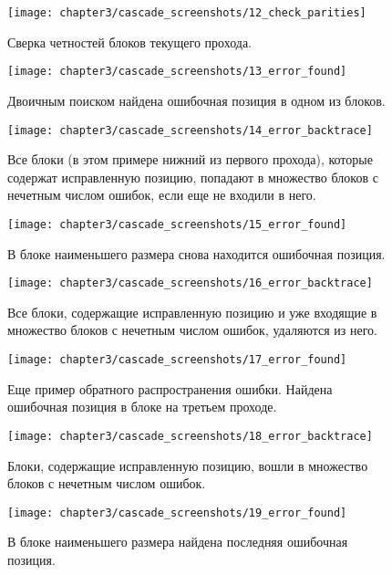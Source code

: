 \begin{figure}[h]
  \texttt{[image: chapter3/cascade\_screenshots/12\_check\_parities]}
  \caption{Сверка четностей блоков текущего прохода.}
\end{figure}

\begin{figure}[h]
  \texttt{[image: chapter3/cascade\_screenshots/13\_error\_found]}
  \caption{Двоичным поиском найдена ошибочная позиция в одном из блоков.}
\end{figure}

\begin{figure}[h]
  \texttt{[image: chapter3/cascade\_screenshots/14\_error\_backtrace]}
  \caption{Все блоки (в этом примере нижний из первого прохода), которые содержат исправленную позицию, попадают в множество блоков с нечетным числом ошибок, если еще не входили в него.}
\end{figure}

\begin{figure}[h]
  \texttt{[image: chapter3/cascade\_screenshots/15\_error\_found]}
  \caption{В блоке наименьшего размера снова находится ошибочная позиция.}
\end{figure}

\begin{figure}[h]
  \texttt{[image: chapter3/cascade\_screenshots/16\_error\_backtrace]}
  \caption{Все блоки, содержащие исправленную позицию и уже входящие в множество блоков с нечетным числом ошибок, удаляются из него.}
\end{figure}

\FloatBarrier
\begin{figure}[h]
  \texttt{[image: chapter3/cascade\_screenshots/17\_error\_found]}
  \caption{Еще пример обратного распространения ошибки. Найдена ошибочная позиция в блоке на третьем проходе.}
\end{figure}

\begin{figure}[h]
  \texttt{[image: chapter3/cascade\_screenshots/18\_error\_backtrace]}
  \caption{Блоки, содержащие исправленную позицию, вошли в множество блоков с нечетным числом ошибок.}
\end{figure}

\begin{figure}[h]
  \texttt{[image: chapter3/cascade\_screenshots/19\_error\_found]}
  \caption{В блоке наименьшего размера найдена последняя ошибочная позиция.}
\end{figure}

